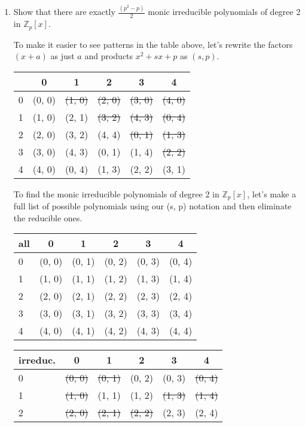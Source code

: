 \documentclass[12pt]{article}
\newcommand{\zee}{\mathbb{Z}}
\begin{document}
\begin{itemize}
\begin{enumerate}[(a.)]
  \item Show that there are exactly $\frac{(p^2-p)}{2}$ monic irreducible polynomials of degree 2 in $\zee_p[x]$.
  \par
  To make it easier to see patterns in the table above, let's rewrite the factors $(x+a)$ as just $a$ and products $x^2+sx+p$ as $(s, p)$.
  \par
  \begin{tabular}{l | c c c c c}
         & 0 & 1 & 2 & 3 & 4 \\
    \hline
    0   & (0, 0) & \st{(1, 0)} & \st{(2, 0)} & \st{(3, 0)} & \st{(4, 0)} \\
    1   & (1, 0) &     (2, 1)  & \st{(3, 2)} & \st{(4, 3)} & \st{(0, 4)} \\
    2   & (2, 0) &     (3, 2)  &     (4, 4)  & \st{(0, 1)} & \st{(1, 3)} \\
    3   & (3, 0) &     (4, 3)  &     (0, 1)  &     (1, 4)  & \st{(2, 2)} \\
    4   & (4, 0) &     (0, 4)  &     (1, 3)  &     (2, 2)  &     (3, 1)  \\
  \end{tabular}
  \par
  To find the monic irreducible polynomials of degree 2 in $\zee_p[x]$, let's make a full list of possible polynomials using our (s, p) notation and then eliminate the reducible ones.
  \par
  \begin{tabular}{l | c c c c c}
    all & 0 & 1 & 2 & 3 & 4 \\
    \hline
    0 & (0, 0) & (0, 1) & (0, 2) & (0, 3) & (0, 4) \\
    1 & (1, 0) & (1, 1) & (1, 2) & (1, 3) & (1, 4) \\
    2 & (2, 0) & (2, 1) & (2, 2) & (2, 3) & (2, 4) \\
    3 & (3, 0) & (3, 1) & (3, 2) & (3, 3) & (3, 4) \\
    4 & (4, 0) & (4, 1) & (4, 2) & (4, 3) & (4, 4) \\
  \end{tabular}
  \par
  \begin{tabular}{l | c c c c c}
    irreduc. & 0 & 1 & 2 & 3 & 4 \\
    \hline
    0 & \st{(0, 0)} & \st{(0, 1)} & (0, 2) & (0, 3) & \st{(0, 4)} \\
    1 & \st{(1, 0)} & (1, 1) & (1, 2) & \st{(1, 3)} & \st{(1, 4)} \\
    2 & \st{(2, 0)} & \st{(2, 1)} & \st{(2, 2)} & (2, 3) & (2, 4) \\

\end{tabular}
\end{enumerate}
\end{itemize}
\end{document}
